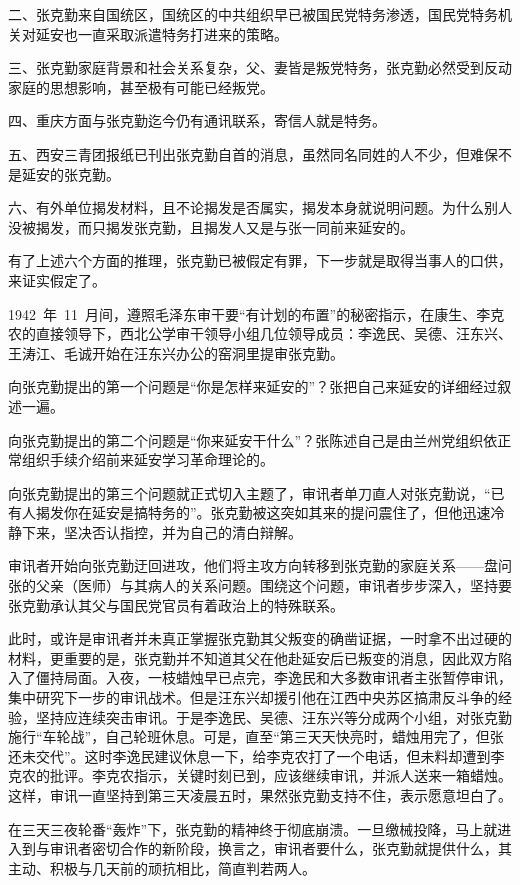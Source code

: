 二、张克勤来自国统区，国统区的中共组织早已被国民党特务渗透，国民党特务机关对延安也一直采取派遣特务打进来的策略。

三、张克勤家庭背景和社会关系复杂，父、妻皆是叛党特务，张克勤必然受到反动家庭的思想影响，甚至极有可能已经叛党。

四、重庆方面与张克勤迄今仍有通讯联系，寄信人就是特务。

五、西安三青团报纸已刊出张克勤自首的消息，虽然同名同姓的人不少，但难保不是延安的张克勤。

六、有外单位揭发材料，且不论揭发是否属实，揭发本身就说明问题。为什么别人没被揭发，而只揭发张克勤，且揭发人又是与张一同前来延安的。

有了上述六个方面的推理，张克勤已被假定有罪，下一步就是取得当事人的口供，来证实假定了。

1942~年~11~月间，遵照毛泽东审干要“有计划的布置”的秘密指示，在康生、李克农的直接领导下，西北公学审干领导小组几位领导成员：李逸民、吴德、汪东兴、王涛江、毛诚开始在汪东兴办公的窑洞里提审张克勤。

向张克勤提出的第一个问题是“你是怎样来延安的”？张把自己来延安的详细经过叙述一遍。

向张克勤提出的第二个问题是“你来延安干什么”？张陈述自己是由兰州党组织依正常组织手续介绍前来延安学习革命理论的。

向张克勤提出的第三个问题就正式切入主题了，审讯者单刀直人对张克勤说，“已有人揭发你在延安是搞特务的”。张克勤被这突如其来的提问震住了，但他迅速冷静下来，坚决否认指控，并为自己的清白辩解。

审讯者开始向张克勤迂回进攻，他们将主攻方向转移到张克勤的家庭关系——盘问张的父亲（医师）与其病人的关系问题。围绕这个问题，审讯者步步深入，坚持要张克勤承认其父与国民党官员有着政治上的特殊联系。

此时，或许是审讯者并未真正掌握张克勤其父叛变的确凿证据，一时拿不出过硬的材料，更重要的是，张克勤并不知道其父在他赴延安后已叛变的消息，因此双方陷入了僵持局面。入夜，一枝蜡烛早已点完，李逸民和大多数审讯者主张暂停审讯，集中研究下一步的审讯战术。但是汪东兴却援引他在江西中央苏区搞肃反斗争的经验，坚持应连续突击审讯。于是李逸民、吴德、汪东兴等分成两个小组，对张克勤施行“车轮战”，自己轮班休息。可是，直至“第三天天快亮时，蜡烛用完了，但张还未交代”。这时李逸民建议休息一下，给李克农打了一个电话，但未料却遭到李克农的批评。李克农指示，关键时刻已到，应该继续审讯，并派人送来一箱蜡烛。这样，审讯一直坚持到第三天凌晨五时，果然张克勤支持不住，表示愿意坦白了。

在三天三夜轮番“轰炸”下，张克勤的精神终于彻底崩溃。一旦缴械投降，马上就进入到与审讯者密切合作的新阶段，换言之，审讯者要什么，张克勤就提供什么，其主动、积极与几天前的顽抗相比，简直判若两人。

